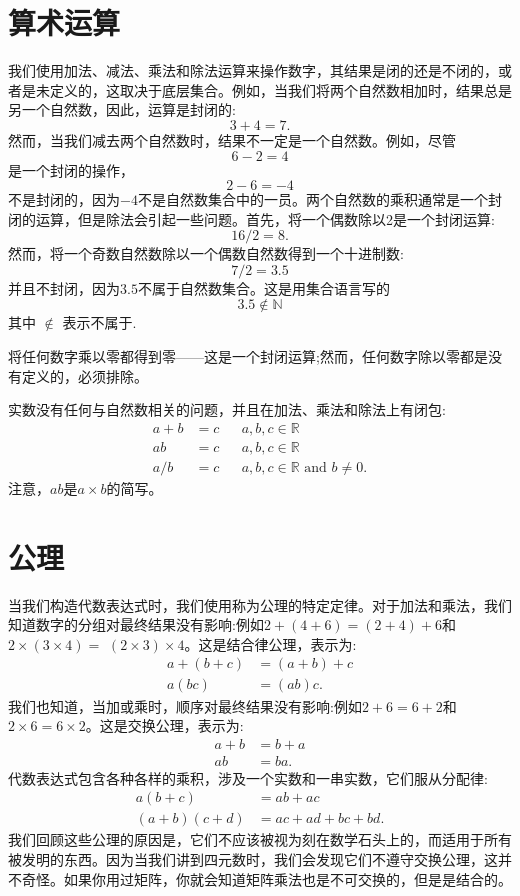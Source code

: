 \section{算术运算}
我们使用加法、减法、乘法和除法运算来操作数字，其结果是闭的还是不闭的，或者是未定义的，这取决于底层集合。例如，当我们将两个自然数相加时，结果总是另一个自然数，因此，运算是封闭的:
$$
3+4=7 .
$$
然而，当我们减去两个自然数时，结果不一定是一个自然数。例如，尽管
$$
6-2=4
$$
是一个封闭的操作，
$$
2-6=-4
$$
不是封闭的，因为$-4$不是自然数集合中的一员。两个自然数的乘积通常是一个封闭的运算，但是除法会引起一些问题。首先，将一个偶数除以2是一个封闭运算:
$$
16 / 2=8 .
$$
然而，将一个奇数自然数除以一个偶数自然数得到一个十进制数:
$$
7 / 2=3.5
$$
并且不封闭，因为$3.5$不属于自然数集合。这是用集合语言写的
$$
3.5 \notin \mathbb{N}
$$
其中 $\notin$ 表示不属于.

将任何数字乘以零都得到零——这是一个封闭运算;然而，任何数字除以零都是没有定义的，必须排除。

实数没有任何与自然数相关的问题，并且在加法、乘法和除法上有闭包:
$$
\begin{aligned}
a+b & =c & & a, b, c \in \mathbb{R} \\
a b & =c & & a, b, c \in \mathbb{R} \\
a / b & =c & & a, b, c \in \mathbb{R} \text { and } b \neq 0 .
\end{aligned}
$$
注意，$a b$是$a \times b$的简写。


\section{公理}
当我们构造代数表达式时，我们使用称为公理的特定定律。对于加法和乘法，我们知道数字的分组对最终结果没有影响:例如$2+(4+6)=(2+4)+6$和$2 \times(3 \times 4)=$ $(2 \times 3) \times 4$。这是结合律公理，表示为:
$$
\begin{aligned}
a+(b+c) & =(a+b)+c \\
a(b c) & =(a b) c .
\end{aligned}
$$
我们也知道，当加或乘时，顺序对最终结果没有影响:例如$2+6=6+2$和$2 \times6=6 \times2$。这是交换公理，表示为:
$$
\begin{aligned}
a+b & =b+a \\
a b & =b a .
\end{aligned}
$$
代数表达式包含各种各样的乘积，涉及一个实数和一串实数，它们服从分配律:
$$
\begin{aligned}
a(b+c) & =a b+a c \\
(a+b)(c+d) & =a c+a d+b c+b d .
\end{aligned}
$$
我们回顾这些公理的原因是，它们不应该被视为刻在数学石头上的，而适用于所有被发明的东西。因为当我们讲到四元数时，我们会发现它们不遵守交换公理，这并不奇怪。如果你用过矩阵，你就会知道矩阵乘法也是不可交换的，但是是结合的。
